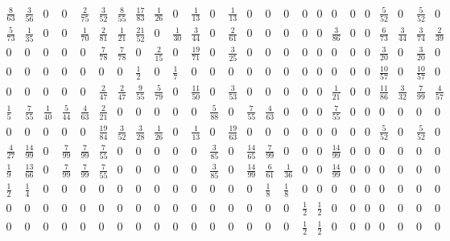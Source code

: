 \documentclass[11pt]{report}
\begin{document}
{\begin{appendices}
\begin{landscape}
\begin{figure} [h!]
\begin{equation*}
\begin{array}{ccccccccccccccccccccccccc}
\frac{8}{63}&\frac{3}{56}&0&0&\frac{2}{75}&\frac{3}{52}&\frac{8}{55}&\frac{17}{83}&\frac{1}{26}&0&\frac{1}{13}&0&\frac{1}{13}&0&0&0&0&0&0&0&0&\frac{5}{52}&0&\frac{5}{52}&0\\

\frac{5}{73}&\frac{1}{35}&0&0&\frac{1}{70}&\frac{2}{81}&\frac{1}{21}&\frac{21}{52}&0&\frac{1}{30}&\frac{3}{44}&0&\frac{2}{61}&0&0&0&0&0&\frac{3}{86}&0&0&\frac{6}{73}&\frac{3}{44}&\frac{3}{74}&\frac{2}{39}\\

0&0&0&0&0&\frac{7}{78}&\frac{7}{78}&0&\frac{2}{15}&0&\frac{19}{71}&0&\frac{3}{25}&0&0&0&0&0&0&0&0&\frac{3}{20}&0&\frac{3}{20}&0\\

0&0&0&0&0&0&0&\frac{1}{2}&0&\frac{1}{7}&0&0&0&0&0&0&0&0&0&0&0&\frac{10}{57}&0&\frac{10}{57}&0\\

0&0&0&0&0&\frac{2}{47}&\frac{2}{47}&\frac{9}{55}&\frac{5}{79}&0&\frac{11}{50}&0&\frac{3}{53}&0&0&0&0&0&\frac{1}{21}&0&0&\frac{11}{86}&\frac{3}{32}&\frac{7}{99}&\frac{4}{57}\\

\frac{1}{5}&\frac{7}{55}&\frac{1}{40}&\frac{5}{44}&\frac{4}{63}&\frac{2}{21}&0&0&0&0&0&\frac{5}{88}&0&\frac{7}{55}&\frac{4}{63}&0&0&0&\frac{7}{55}&0&0&0&0&0&0\\

0&0&0&0&0&\frac{19}{84}&\frac{3}{52}&\frac{3}{28}&\frac{1}{26}&0&\frac{1}{13}&0&\frac{19}{63}&0&0&0&0&0&0&0&0&\frac{5}{52}&0&\frac{5}{52}&0\\

\frac{4}{27}&\frac{14}{99}&0&\frac{7}{99}&\frac{7}{99}&\frac{7}{55}&0&0&0&0&0&\frac{3}{85}&0&\frac{14}{65}&\frac{7}{99}&0&0&0&\frac{14}{99}&0&0&0&0&0&0\\

\frac{1}{9}&\frac{13}{66}&0&\frac{7}{99}&\frac{7}{99}&\frac{7}{55}&0&0&0&0&0&\frac{3}{85}&0&\frac{14}{99}&\frac{6}{61}&\frac{1}{36}&0&0&\frac{14}{99}&0&0&0&0&0&0\\

\frac{1}{2}&\frac{1}{4}&0&0&0&0&0&0&0&0&0&0&0&0&\frac{1}{8}&\frac{1}{8}&0&0&0&0&0&0&0&0&0\\

0&0&0&0&0&0&0&0&0&0&0&0&0&0&0&0&\frac{1}{2}&\frac{1}{2}&0&0&0&0&0&0&0\\

0&0&0&0&0&0&0&0&0&0&0&0&0&0&0&0&\frac{1}{2}&\frac{1}{2}&0&0&0&0&0&0&0\\


\end{array}
\end{equation*}
\end{figure}
\end{landscape}
\end{appendices}}
\end{document}
